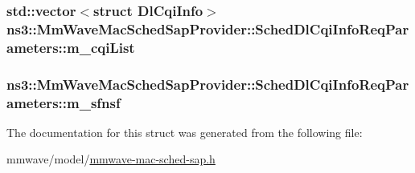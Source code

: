 \subsubsection[{\texorpdfstring{m\+\_\+cqi\+List}{m_cqiList}}]{\setlength{\rightskip}{0pt plus 5cm}std\+::vector$<$struct {\bf Dl\+Cqi\+Info}$>$ ns3\+::\+Mm\+Wave\+Mac\+Sched\+Sap\+Provider\+::\+Sched\+Dl\+Cqi\+Info\+Req\+Parameters\+::m\+\_\+cqi\+List}\hypertarget{structns3_1_1MmWaveMacSchedSapProvider_1_1SchedDlCqiInfoReqParameters_a5372c7a49941c7834e7c01153ed97e19}{}\label{structns3_1_1MmWaveMacSchedSapProvider_1_1SchedDlCqiInfoReqParameters_a5372c7a49941c7834e7c01153ed97e19}
\subsubsection[{\texorpdfstring{m\+\_\+sfnsf}{m_sfnsf}}]{ ns3\+::\+Mm\+Wave\+Mac\+Sched\+Sap\+Provider\+::\+Sched\+Dl\+Cqi\+Info\+Req\+Parameters\+::m\+\_\+sfnsf}\hypertarget{structns3_1_1MmWaveMacSchedSapProvider_1_1SchedDlCqiInfoReqParameters_a38045fb933c29fcd19d9ad164250ee31}{}\label{structns3_1_1MmWaveMacSchedSapProvider_1_1SchedDlCqiInfoReqParameters_a38045fb933c29fcd19d9ad164250ee31}


The documentation for this struct was generated from the following file\+:\begin{DoxyCompactItemize}
\item 
mmwave/model/\hyperlink{mmwave-mac-sched-sap_8h}{mmwave-\/mac-\/sched-\/sap.\+h}\end{DoxyCompactItemize}
